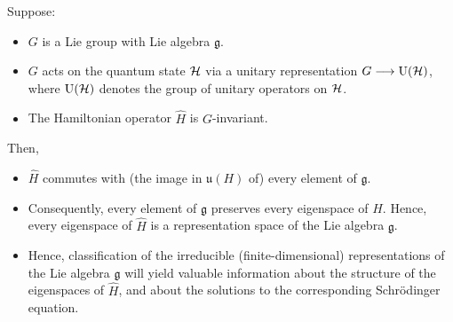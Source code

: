 Suppose:
\begin{itemize}
\item
	$G$ is a Lie group with Lie algebra $\mathfrak{g}$.
\item
	$G$ acts on the quantum state $\mathcal{H}$ via a unitary representation $G \longrightarrow \textnormal{U}(\mathcal{H})$,
	where $\textnormal{U}(\mathcal{H})$ denotes the group of unitary operators on $\mathcal{H}$.
\item
	The Hamiltonian operator $\widehat{H}$ is $G$-invariant.
\end{itemize}
Then,
\begin{itemize}
\item
	$\widehat{H}$ commutes with (the image in $\mathfrak{u}(H)$ of) every element of $\mathfrak{g}$.
\item
	Consequently, every element of $\mathfrak{g}$ preserves every eigenspace of $\widehat{H}$.
	Hence, every eigenspace of $\widehat{H}$ is a representation space of the Lie algebra $\mathfrak{g}$.
\item
	Hence, classification of the irreducible (finite-dimensional) representations of the Lie algebra $\mathfrak{g}$
	will yield valuable information about the structure of the eigenspaces of $\widehat{H}$, and
	about the solutions to the corresponding Schr\"{o}dinger equation.
\end{itemize}

